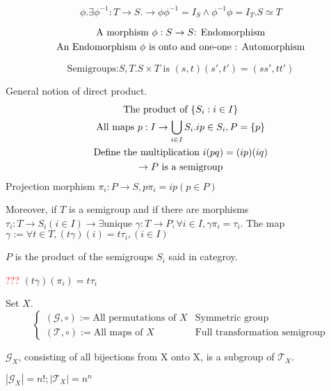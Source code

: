 \begin{Def}[Isomorphism]
    \[
        \phi. \exists \phi^{-1}: T \rightarrow S. \rightarrow
        \phi\phi^{-1}=I_S \wedge \phi^{-1}\phi=I_T. S \simeq T
    \]
\end{Def}

\begin{Def}
    \begin{gather*}
        \text{A morphism } \phi: S \rightarrow S    \text{: Endomorphism}\\
        \text{An Endomorphism } \phi \text{ is onto and one-one \text{: Automorphism}}
    \end{gather*}
\end{Def}

\begin{Def}
    \[\text{Semigroups:}S,T. S\times T \text{ is } (s,t)(s',t')=(ss',tt')\]

    General notion of direct product.
    \begin{gather*}
        \text{The product of } \{S_i:i\in I\}   \\
        \text{All maps } p: I \rightarrow \bigcup _{i \in I} S_i. ip\in S_i, P=\{p\}  \\
        \text{Define the multiplication }i(pq)=(ip)(iq) \\
        \rightarrow P \text{\space is a semigroup}
    \end{gather*}
    Projection morphism
    $\pi_i:P \rightarrow S, p\pi_i=ip(p \in P)$
    
    Moreover, if $T$ is a semigroup and if there are morphisms $\tau_i:T\rightarrow S_i(i \in I) \rightarrow \exists \text{unique } \gamma: T \rightarrow P, \forall i\in I,\gamma \pi_i=\tau_i$. The map $\gamma:= \forall t \in T, (t\gamma)(i)=t\tau_i,(i \in I)$

    $P$ is the product of the semigroups $S_i$ said in categroy.

    \textcolor{red}{???} $(t\gamma)(\pi_i)=t\tau_i$
\end{Def}

\begin{Def}Set $X$.
    \[
    \begin{cases}
        (\mathcal{G},\circ):= \text{All permutations of }X  &  \text{Symmetric group}   \\
        (\mathcal{T},\circ):= \text{All maps of }X          &   \text{Full transformation semigroup}
    \end{cases}\]
    
    $\mathcal{G}_X$, consisting of all bijections from X onto X, is a subgroup of $\mathcal{T}_X$.

    $|\mathcal{G}_X|=n!; |\mathcal{T}_X|=n^n$
\end{Def}

